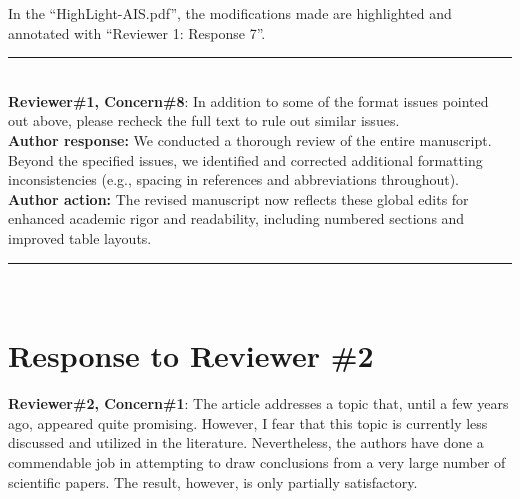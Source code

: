 \documentclass[Afour,sageh,times]{sagej}
\begin{document}
\textcolor{myOrange}{
In the “HighLight-AIS.pdf”, the modifications made are highlighted and annotated with “Reviewer 1: Response 7”.} \\%

\color{gray}\rule{\linewidth}{1pt}\normalcolor\\

\textcolor{myGreen}{ \textbf{Reviewer\#1, Concern\#8}: In addition to some of the format issues pointed out above, please recheck the full text to rule out similar issues.}  \\

\textbf{Author response:} We conducted a thorough review of the entire manuscript. Beyond the specified issues, we identified and corrected additional formatting inconsistencies (e.g., spacing in references and abbreviations throughout).\\
\textbf{Author action:} The revised manuscript now reflects these global edits for enhanced academic rigor and readability, including numbered sections and improved table layouts. \\
  
\color{gray}\rule{\linewidth}{1pt}\normalcolor\\

\section*{Response to Reviewer \#2}  

\textcolor{myGreen}{ \textbf{Reviewer\#2, Concern\#1}: The article addresses a topic that, until a few years ago, appeared quite promising. However, I fear that this topic is currently less discussed and utilized in the literature. Nevertheless, the authors have done a commendable job in attempting to draw conclusions from a very large number of scientific papers. The result, however, is only partially satisfactory.} \\ 
\end{document}
